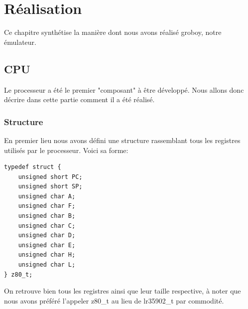 \documentclass{report}
\begin{document}
\chapter{Réalisation}
Ce chapitre synthétise la manière dont nous avons réalisé groboy, notre émulateur.
\section{CPU}
Le processeur a été le premier "composant" à être développé. Nous allons donc décrire dans cette partie comment il a été réalisé.
\subsection{Structure}
En premier lieu nous avons défini une structure rassemblant tous les registres utilisés par le processeur.
Voici sa forme:
\begin{lstlisting}
typedef struct {
	unsigned short PC;
	unsigned short SP;
	unsigned char A;
	unsigned char F;
	unsigned char B;
	unsigned char C;
	unsigned char D;
	unsigned char E;
	unsigned char H;
	unsigned char L;	
} z80_t;
\end{lstlisting}
On retrouve bien tous les registres ainsi que leur taille respective, à noter que nous avons préféré l'appeler z80\_t au lieu de lr35902\_t par commodité.
\end{document}
